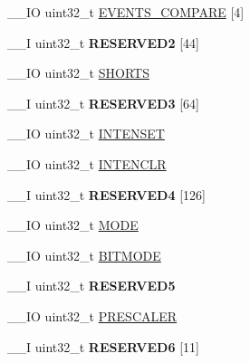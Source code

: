 \begin{DoxyCompactItemize}
\item 
\+\_\+\+\_\+\+I\+O uint32\+\_\+t \hyperlink{struct_n_r_f___t_i_m_e_r___type_a6bb1defc578169c713a6aa27e7e3f96a}{E\+V\+E\+N\+T\+S\+\_\+\+C\+O\+M\+P\+A\+R\+E} \mbox{[}4\mbox{]}
\item 
\hypertarget{struct_n_r_f___t_i_m_e_r___type_ad26382f9bcba7532289330d5f7f1c191}{}\+\_\+\+\_\+\+I uint32\+\_\+t {\bfseries R\+E\+S\+E\+R\+V\+E\+D2} \mbox{[}44\mbox{]}\label{struct_n_r_f___t_i_m_e_r___type_ad26382f9bcba7532289330d5f7f1c191}

\item 
\+\_\+\+\_\+\+I\+O uint32\+\_\+t \hyperlink{struct_n_r_f___t_i_m_e_r___type_a8634e91d642eef3e15e927eecd45f85d}{S\+H\+O\+R\+T\+S}
\item 
\hypertarget{struct_n_r_f___t_i_m_e_r___type_ae68917129e69b310f81d6cfcbe280665}{}\+\_\+\+\_\+\+I uint32\+\_\+t {\bfseries R\+E\+S\+E\+R\+V\+E\+D3} \mbox{[}64\mbox{]}\label{struct_n_r_f___t_i_m_e_r___type_ae68917129e69b310f81d6cfcbe280665}

\item 
\+\_\+\+\_\+\+I\+O uint32\+\_\+t \hyperlink{struct_n_r_f___t_i_m_e_r___type_a24f52bd675f7dda470358f0e743250d1}{I\+N\+T\+E\+N\+S\+E\+T}
\item 
\+\_\+\+\_\+\+I\+O uint32\+\_\+t \hyperlink{struct_n_r_f___t_i_m_e_r___type_aa80341ecd4ae54ab7c087ab2ea54ee17}{I\+N\+T\+E\+N\+C\+L\+R}
\item 
\hypertarget{struct_n_r_f___t_i_m_e_r___type_a01047d46fa281e00435dd828140acc83}{}\+\_\+\+\_\+\+I uint32\+\_\+t {\bfseries R\+E\+S\+E\+R\+V\+E\+D4} \mbox{[}126\mbox{]}\label{struct_n_r_f___t_i_m_e_r___type_a01047d46fa281e00435dd828140acc83}

\item 
\+\_\+\+\_\+\+I\+O uint32\+\_\+t \hyperlink{struct_n_r_f___t_i_m_e_r___type_aeee5018aa015968ff8cd3d0c088ce1e2}{M\+O\+D\+E}
\item 
\+\_\+\+\_\+\+I\+O uint32\+\_\+t \hyperlink{struct_n_r_f___t_i_m_e_r___type_ae61db5f1fc79613887c93a27b1870b3c}{B\+I\+T\+M\+O\+D\+E}
\item 
\hypertarget{struct_n_r_f___t_i_m_e_r___type_afdf73a010764ba9e43aeed78d5b045b2}{}\+\_\+\+\_\+\+I uint32\+\_\+t {\bfseries R\+E\+S\+E\+R\+V\+E\+D5}\label{struct_n_r_f___t_i_m_e_r___type_afdf73a010764ba9e43aeed78d5b045b2}

\item 
\+\_\+\+\_\+\+I\+O uint32\+\_\+t \hyperlink{struct_n_r_f___t_i_m_e_r___type_a906275906d223342c005362f778db3ca}{P\+R\+E\+S\+C\+A\+L\+E\+R}
\item 
\hypertarget{struct_n_r_f___t_i_m_e_r___type_afbc34aef578f598a501055d97ab29465}{}\+\_\+\+\_\+\+I uint32\+\_\+t {\bfseries R\+E\+S\+E\+R\+V\+E\+D6} \mbox{[}11\mbox{]}\label{struct_n_r_f___t_i_m_e_r___type_afbc34aef578f598a501055d97ab29465}


\end{DoxyCompactItemize}
